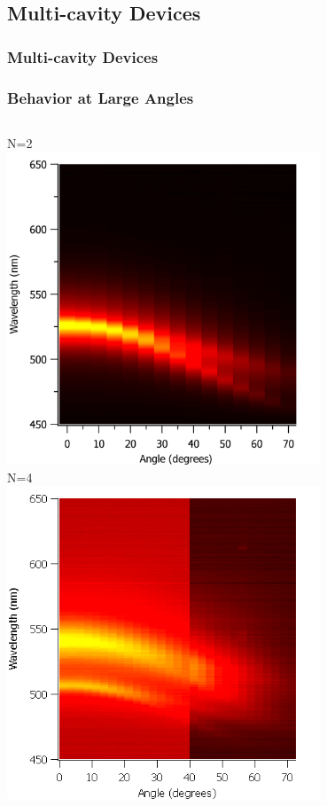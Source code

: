 \documentclass{beamer}
\begin{document}
    \subsection{Multi-cavity Devices}
        \begin{frame}
            \frametitle{Multi-cavity Devices}
        \end{frame}
        
        \begin{frame}
            \frametitle{Behavior at Large Angles}
            \begin{columns}
				\begin{column}{0.5\textwidth}
					\centering
					N=2\\
					\includegraphics[width=0.7\textwidth]{images/n2_heatmap.png}\\
					N=4\\
					\includegraphics[width=0.7\textwidth]{images/n4_heatmap.png}

\end{column}
\end{columns}
\end{frame}
\end{document}
